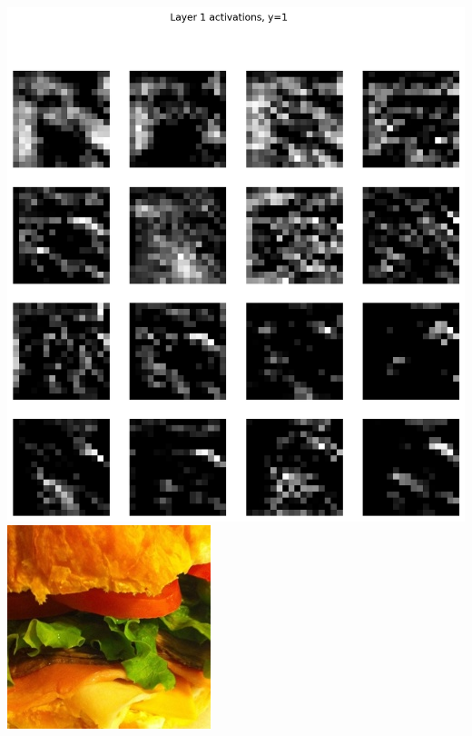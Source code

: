\documentclass[11pt, answers]{exam}
\begin{document}
\begin{solution}
\begin{parts}
\begin{center}
      \includegraphics[scale=0.6]{CNN_viz1_1.png}
      \includegraphics[scale=0.3]{00004.jpg}

\end{center}
\end{parts}
\end{solution}
\end{document}
